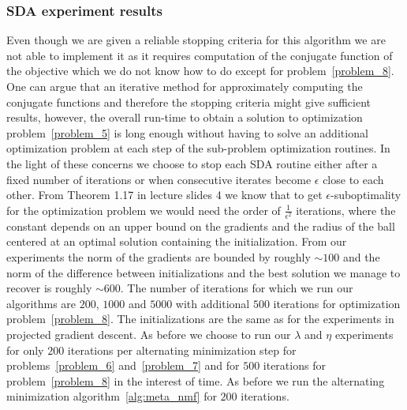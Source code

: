 \documentclass{article}
\newcommand{\0}{\mathrm{0}}
\newcommand{\1}{\mathrm{1}}
\begin{document}
\subsubsection{SDA experiment results}
Even though we are given a reliable stopping criteria for this algorithm we are not able to implement it as it requires computation of the conjugate function of the objective which we do not know how to do except for problem~\ref{problem_8}. One can argue that an iterative method for approximately computing the conjugate functions and therefore the stopping criteria might give sufficient results, however, the overall run-time to obtain a solution to optimization problem~\ref{problem_5} is long enough without having to solve an additional optimization problem at each step of the sub-problem optimization routines. In the light of these concerns we choose to stop each SDA routine either after a fixed number of iterations or when consecutive iterates become $\epsilon$ close to each other. From Theorem 1.17 in lecture slides 4 we know that to get $\epsilon$-suboptimality for the optimization problem we would need the order of $\frac{1}{\epsilon^2}$ iterations, where the constant depends on an upper bound on the gradients and the radius of the ball centered at an optimal solution containing the initialization. From our experiments the norm of the gradients are bounded by roughly $\sim 100$ and the norm of the difference between initializations and the best solution we manage to recover is roughly $\sim 600$. The number of iterations for which we run our algorithms are $200$, $1000$ and $5000$ with additional $500$ iterations for optimization problem~\ref{problem_8}. The initializations are the same as for the experiments in projected gradient descent. As before we choose to run our $\lambda$ and $\eta$ experiments for only $200$ iterations per alternating minimization step for problems~\ref{problem_6} and~\ref{problem_7} and for $500$ iterations for problem~\ref{problem_8} in the interest of time. As before we run the alternating minimization algorithm~\ref{alg:meta_nmf} for $200$ iterations.
\end{document}
